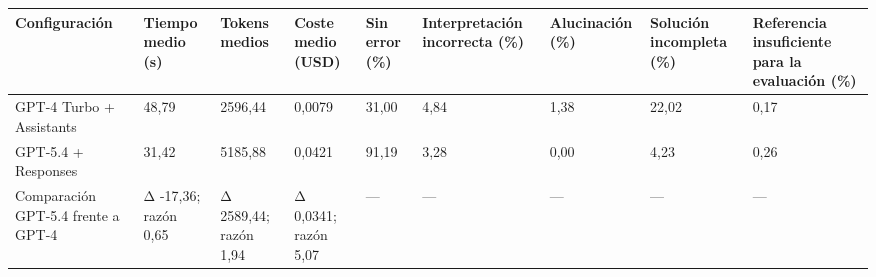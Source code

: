 \begin{tabular}{lllllllll}
\toprule
Configuración & Tiempo medio (s) & Tokens medios & Coste medio (USD) & Sin error (\%) & Interpretación incorrecta (\%) & Alucinación (\%) & Solución incompleta (\%) & Referencia insuficiente para la evaluación (\%) \\
\midrule
GPT-4 Turbo + Assistants & 48,79 & 2596,44 & 0,0079 & 31,00 & 4,84 & 1,38 & 22,02 & 0,17 \\
GPT-5.4 + Responses & 31,42 & 5185,88 & 0,0421 & 91,19 & 3,28 & 0,00 & 4,23 & 0,26 \\
Comparación GPT-5.4 frente a GPT-4 & Δ -17,36; razón 0,65 & Δ 2589,44; razón 1,94 & Δ 0,0341; razón 5,07 & — & — & — & — & — \\
\bottomrule
\end{tabular}

